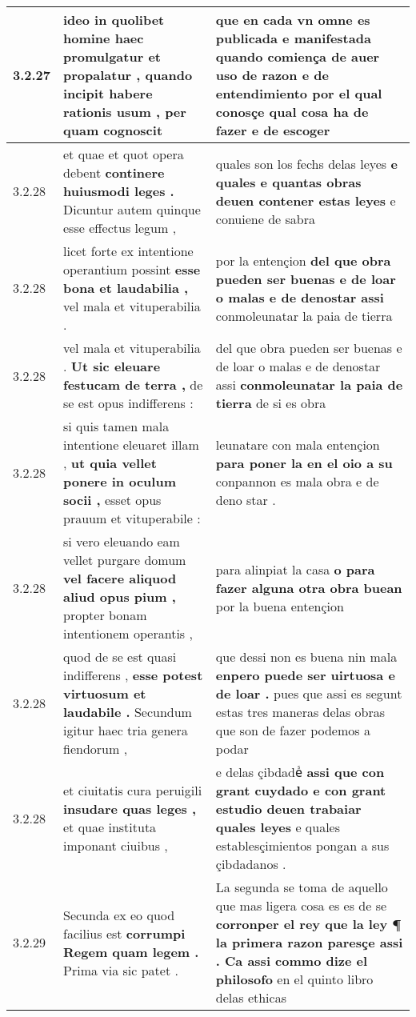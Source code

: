 \begin{tabular}{|p{1cm}|p{6.5cm}|p{6.5cm}|}
3.2.27 & ideo in quolibet homine haec promulgatur et propalatur , \textbf{ quando incipit habere rationis usum , } per quam cognoscit & que en cada vn omne es publicada e manifestada \textbf{ quando comiença de auer uso de razon e de entendimiento } por el qual conosçe qual cosa ha de fazer e de escoger \\\hline
3.2.28 & et quae et quot opera debent \textbf{ continere huiusmodi leges . } Dicuntur autem quinque esse effectus legum , & quales son los fechs delas leyes \textbf{ e quales e quantas obras deuen contener estas leyes } e conuiene de sabra \\\hline
3.2.28 & licet forte ex intentione operantium possint \textbf{ esse bona et laudabilia , } vel mala et vituperabilia . & por la entençion \textbf{ del que obra pueden ser buenas e de loar o malas e de denostar assi } conmoleunatar la paia de tierra \\\hline
3.2.28 & vel mala et vituperabilia . \textbf{ Ut sic eleuare festucam de terra , } de se est opus indifferens : & del que obra pueden ser buenas e de loar o malas e de denostar assi \textbf{ conmoleunatar la paia de tierra } de si es obra \\\hline
3.2.28 & si quis tamen mala intentione eleuaret illam , \textbf{ ut quia vellet ponere in oculum socii , } esset opus prauum et vituperabile : & leunatare con mala entençion \textbf{ para poner la en el oio a su } conpannon es mala obra e de deno star . \\\hline
3.2.28 & si vero eleuando eam vellet purgare domum \textbf{ vel facere aliquod aliud opus pium , } propter bonam intentionem operantis , & para alinpiat la casa \textbf{ o para fazer alguna otra obra buean } por la buena entençion \\\hline
3.2.28 & quod de se est quasi indifferens , \textbf{ esse potest virtuosum et laudabile . } Secundum igitur haec tria genera fiendorum , & que dessi non es buena nin mala \textbf{ enpero puede ser uirtuosa e de loar . } pues que assi es segunt estas tres maneras delas obras que son de fazer podemos a podar \\\hline
3.2.28 & et ciuitatis cura peruigili \textbf{ insudare quas leges , } et quae instituta imponant ciuibus , & e delas çibdadeᷤ \textbf{ assi que con grant cuydado e con grant estudio deuen trabaiar quales leyes } e quales establesçimientos pongan a sus çibdadanos . \\\hline
3.2.29 & Secunda ex eo quod facilius est \textbf{ corrumpi Regem quam legem . } Prima via sic patet . & La segunda se toma de aquello que mas ligera cosa es es de se \textbf{ corronper el rey que la ley ¶ la primera razon paresçe assi . Ca assi commo dize el philosofo } en el quinto libro delas ethicas \\\hline

\end{tabular}
